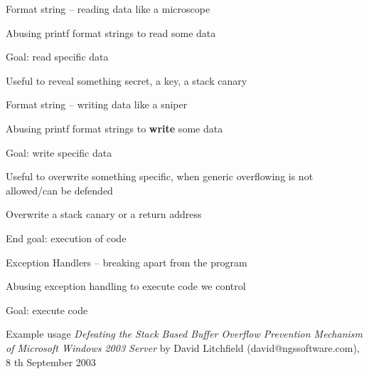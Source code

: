 \documentclass[Screen16to9,17pt]{foils}
\begin{document}

\begin{list1}
\item Format string -- reading data like a microscope
\begin{list2}
\item Abusing printf format strings to read some data
\item Goal: read specific data
\end{list2}
\item Useful to reveal something secret, a key, a stack canary
\end{list1}


\begin{list1}
\item Format string -- writing data like a sniper
\begin{list2}
\item Abusing printf format strings to {\bf write} some data
\item Goal: write specific data
\end{list2}
\item Useful to overwrite something specific, when generic overflowing is not allowed/can be defended
\item Overwrite a stack canary or a return address
\item End goal: execution of code
\end{list1}





\begin{list1}
\item Exception Handlers -- breaking apart from the program
\begin{list2}
\item Abusing exception handling to execute code we control
\item Goal: execute code
\end{list2}
\item Example usage
\emph{Defeating the Stack Based Buffer Overflow Prevention Mechanism of Microsoft Windows 2003 Server } by David Litchfield (david@ngssoftware.com), 8 th September 2003
\end{list1}


\end{document}
